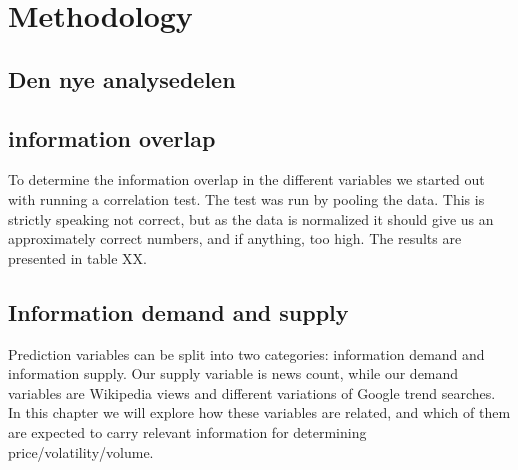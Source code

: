 
\chapter{Methodology}

\section{Den nye analysedelen}
\section{information overlap}
To determine the information overlap in the different variables we started out with running a correlation test. The test was run by pooling the data. This is strictly speaking not correct, but as the data is normalized it should give us an approximately correct numbers, and if anything, too high. The results are presented in table XX.



\section{Information demand and supply}
Prediction variables can be split into two categories: information demand and information supply. Our supply variable is news count, while our demand variables are Wikipedia views and different variations of Google trend searches. In this chapter we will explore how these variables are related, and which of them are expected to carry relevant information for determining price/volatility/volume. 

